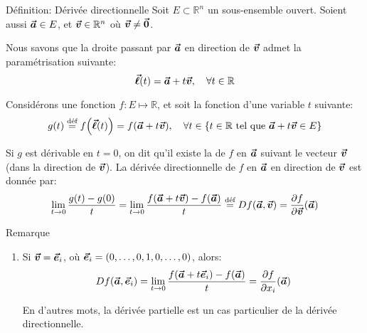 \documentclass[a4paper]{article}
\begin{document}
\begin{parag}{Définition: Dérivée directionnelle}
    Soit $E \subset \mathbb{R}^n$ un sous-ensemble ouvert. Soient aussi $\bm{\protect\vec{a}} \in E$, et $\bm{\protect\vec{v}} \in\mathbb{R}^n$ où $\bm{\protect\vec{v}} \neq \bm{\protect\vec{0}}$.

    Nous savons que la droite passant par $\bm{\protect\vec{a}}$ en direction de $\bm{\protect\vec{v}}$ admet la paramétrisation suivante: 
    \[\bvec{\ell}\left(t\right) = \bvec{a} + t \bvec{v}, \mathspace \forall t \in \mathbb{R}\]

    
    Considérons une fonction $f :E \mapsto \mathbb{R}$, et soit la fonction d'une variable $t$ suivante:
    \[g\left(t\right) \over{=}{déf} f\left(\bvec{\ell}\left(t\right)\right) = f\left(\bvec{a} + t \bvec{v}\right), \mathspace \forall t \in \left\{t \in \mathbb{R} \telque \bvec{a} + t \bvec{v} \in E\right\}\]

    Si $g$ est dérivable en $t = 0$, on dit qu'il existe la  de $f$ en $\bm{\protect\vec{a}}$ suivant le vecteur $\bm{\protect\vec{v}}$ (dans la direction de $\bm{\protect\vec{v}}$). La dérivée directionnelle de $f$ en $\bm{\protect\vec{a}}$ en direction de $\bm{\protect\vec{v}}$ est donnée par: 
    \[\lim_{t \to 0} \frac{g\left(t\right) - g\left(0\right)}{t} = \lim_{t \to 0} \frac{f\left(\bvec{a} + t \bvec{v}\right) - f\left(\bvec{a}\right)}{t} \over{=}{déf}  Df\left(\bvec{a}, \bvec{v}\right) = \frac{\partial f}{\partial \bvec{v}}\left(\bvec{a}\right)\]

    \begin{subparag}{Remarque}
        \begin{enumerate}[left=0pt]
            \item Si $\bm{\protect\vec{v}} = \bm{\protect\vec{e}}_i$, où $\bvec{e}_i = \left(0, \ldots, 0, 1, 0, \ldots, 0\right)$, alors: 
                \[Df\left(\bvec{a}, \bvec{e}_i\right) = \lim_{t \to 0} \frac{f\left(\bvec{a} + t \bvec{e}_i\right) - f\left(\bvec{a}\right)}{t} = \frac{\partial f}{\partial x_i}\left(\bvec{a}\right)\]
            
                En d'autres mots, la dérivée partielle est un cas particulier de la dérivée directionnelle.


\end{enumerate}
\end{subparag}
\end{parag}
\end{document}
